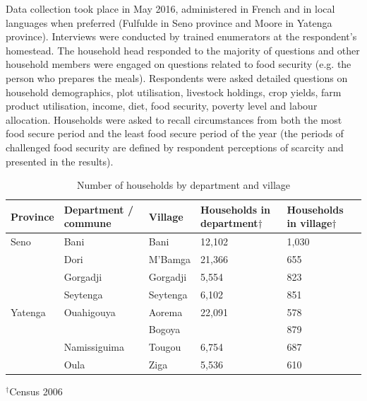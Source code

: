 Data collection took place in May 2016, administered in French and in local languages when preferred (Fulfulde in Seno province and Moore in Yatenga province). Interviews were conducted by trained enumerators at the respondent's homestead. The household head responded to the majority of questions and other household members were engaged on questions related to food security (e.g. the person who prepares the meals). Respondents were asked detailed questions on household demographics, plot utilisation, livestock holdings, crop yields, farm product utilisation, income, diet, food security, poverty level and labour allocation. Households were asked to recall circumstances from both the most food secure period and the least food secure period of the year (the periods of challenged food security are defined by respondent perceptions of scarcity and presented in the results).

\begin{table}[b]
  \captionsetup{singlelinecheck = false, justification=justified} %
  \caption{Number of households by department and village}
  \label{tab:05_1}
  \small
\begin{tabularx}{\textwidth}{@{}lllYY@{}}
\toprule
Province & Department / commune & Village & Households in department${\dag}$ & Households in village${\dag}$ \\
\midrule
Seno & Bani & Bani & 12,102 & 1,030 \\
 & Dori & M'Bamga & 21,366 & 655 \\
 & Gorgadji & Gorgadji & 5,554 & 823 \\
 & Seytenga & Seytenga & 6,102 & 851 \\
Yatenga & Ouahigouya & Aorema & 22,091 & 578 \\
 & & Bogoya & & 879 \\
 & Namissiguima & Tougou & 6,754 & 687 \\
 & Oula & Ziga & 5,536 & 610 \\
 \bottomrule
\end{tabularx}
\footnotesize
\raggedright
${^\dag}$Census 2006%
\end{table}



